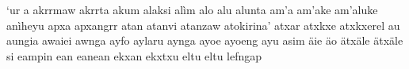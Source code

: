 \documentclass[a4paper]{article}
\begin{document}
`ur\hspace{2mm}
a\hspace{2mm}
akrrmaw\hspace{2mm}
akrrta\hspace{2mm}
akum\hspace{2mm}
alaksi\hspace{2mm}
alìm\hspace{2mm}
alo\hspace{2mm}
alu\hspace{2mm}
alunta\hspace{2mm}
am'a\hspace{2mm}
am'ake\hspace{2mm}
am'aluke\hspace{2mm}
anìheyu\hspace{2mm}
apxa\hspace{2mm}
apxangrr\hspace{2mm}
atan\hspace{2mm}
atanvi\hspace{2mm}
atanzaw\hspace{2mm}
atokirina'\hspace{2mm}
atxar\hspace{2mm}
atxkxe\hspace{2mm}
atxkxerel\hspace{2mm}
au\hspace{2mm}
aungia\hspace{2mm}
awaiei\hspace{2mm}
awnga\hspace{2mm}
ayfo\hspace{2mm}
aylaru\hspace{2mm}
aynga\hspace{2mm}
ayoe\hspace{2mm}
ayoeng\hspace{2mm}
ayu\hspace{2mm}
asim\hspace{2mm}
äie\hspace{2mm}
äo\hspace{2mm}
ätxäle\hspace{2mm}
ätxäle si\hspace{2mm}
eampin\hspace{2mm}
ean\hspace{2mm}
eanean\hspace{2mm}
ekxan\hspace{2mm}
ekxtxu\hspace{2mm}
eltu\hspace{2mm}
eltu lefngap\hspace{2mm}
\end{document}
